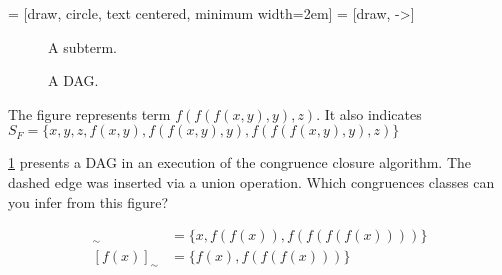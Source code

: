 \documentclass[11pt,a4paper]{article}
\begin{document}
 = [draw, circle, text centered, minimum width=2em]
 = [draw, ->]
\begin{figure}[ht]
    \begin{minipage}[b]{.45\textwidth}
        \centering
        \caption{A subterm.}
        \label{fig:subterm}
    \end{minipage}
    \begin{minipage}[b]{.45\textwidth}
        \centering
    \caption{A DAG.}
    \label{fig:dag}
    \end{minipage}
\end{figure}

\begin{solution}
    The figure represents term $f(f(f(x, y), y), z)$. It also indicates \\ $S_F = \{x, y, z, f(x, y), f(f(x, y), y), f(f(f(x, y), y), z)\}$
\end{solution}

\subproblem \cref{fig:dag} presents a DAG in an execution of the congruence closure algorithm.
The dashed edge was inserted via a union operation.
Which congruences classes can you infer from this figure?

\begin{solution}
    \begin{align*}
        [x]_{\sim} &= \{x, f(f(x)), f(f(f(f(x))))\} \\
        [f(x)]_{\sim} &= \{f(x), f(f(f(x)))\}
    \end{align*}    
\end{solution}
\end{document}
